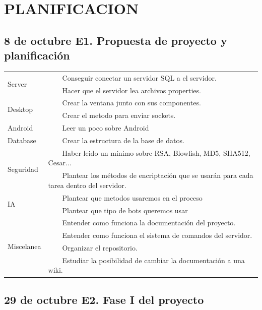 \documentclass{article}
\newcommand{\tabitem}{~~\llap{\textbullet}~~}
\theoremstyle{definition}
\begin{document}
\section{PLANIFICACION}

\subsection{8 de octubre	E1. Propuesta de proyecto y planificación }

\begin{tabular}{|p{3cm}|p{11cm}|}
\hline
\multirow{2}{*}{Server} & \tabitem Conseguir conectar un servidor SQL a el servidor.\\
& \tabitem Hacer que el servidor lea archivos properties.\\
\hline
\multirow{2}{*}{Desktop} & \tabitem Crear la ventana junto con sus componentes.\\
& \tabitem Crear el metodo para enviar sockets. \\
\hline  
 Android & \tabitem Leer un poco sobre Android \\
\hline 
 Database & \tabitem  Crear la estructura de la base de datos. \\
 \hline 
 \multirow{2}{*}{Seguridad} & \tabitem Haber leido un mínimo sobre RSA, Blowfish, MD5, SHA512, Cesar... \\
 & \tabitem Plantear los métodos de encriptación que se usarán para cada tarea dentro del servidor.\\
 \hline 
 \multirow{2}{*}{IA} & \tabitem Plantear que metodos usaremos en el proceso \\
 &  \tabitem Plantear que tipo de bots queremos usar\\
 \hline 
 \multirow{4}{*}{Miscelanea} & \tabitem  Entender como funciona la documentación del proyecto. \\
 & \tabitem Entender como funciona el sistema de comandos del servidor. \\
 & \tabitem Organizar el repositorio.\\
 & \tabitem Estudiar la posibilidad de cambiar la documentación a una wiki.\\
\hline
\end{tabular}



\subsection{29 de octubre	E2. Fase I del proyecto}
\end{document}
